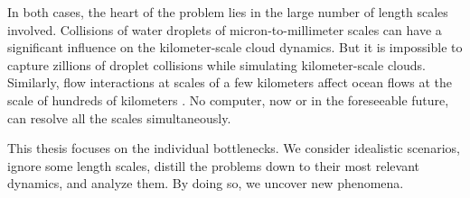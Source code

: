 \documentclass[../Rajarshi-thesis-draft.tex]{subfiles}
\begin{document}
In both cases, the heart of the problem lies in the large number of length scales involved. Collisions of water droplets of micron-to-millimeter scales can have a significant influence on the kilometer-scale cloud dynamics. But it is impossible to capture zillions of droplet collisions while simulating kilometer-scale clouds. Similarly, flow interactions at scales of a few kilometers affect ocean flows at the scale of hundreds of kilometers \cite{klein2019}. No computer, now or in the foreseeable future, can resolve all the scales simultaneously. 


This thesis focuses on the individual bottlenecks. We consider idealistic scenarios, ignore some length scales, distill the problems down to their most relevant dynamics, and analyze them. By doing so, we uncover new phenomena.

\end{document}
